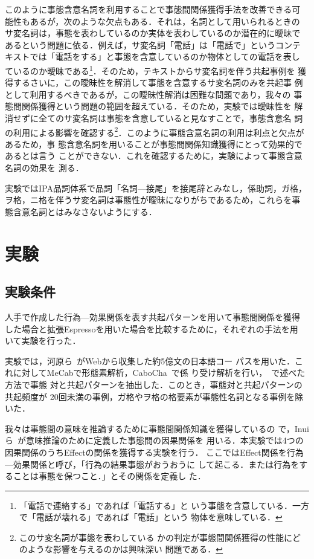 \documentclass[japanese]{jnlp_1.4}
\begin{document}
このように事態含意名詞を利用することで事態間関係獲得手法を改善できる可
能性もあるが，次のような欠点もある．それは，名詞として用いられるときの
サ変名詞は，事態を表わしているのか実体を表わしているのか潜在的に曖昧で
あるという問題に依る．例えば，サ変名詞「電話」は「電話で」というコンテ
キストでは「電話をする」と事態を含意しているのか物体としての電話を表し
ているのか曖昧である\footnote{「電話で連絡する」であれば「電話する」と
  いう事態を含意している．一方で「電話が壊れる」であれば「電話」という
  物体を意味している．}．そのため，テキストからサ変名詞を伴う共起事例を
獲得するさいに，この曖昧性を解消して事態を含意するサ変名詞のみを共起事
例として利用するべきであるが，この曖昧性解消は困難な問題であり，我々の
事態間関係獲得という問題の範囲を超えている．そのため，実験では曖昧性を
解消せずに全てのサ変名詞は事態を含意していると見なすことで，事態含意名
詞の利用による影響を確認する\footnote{このサ変名詞が事態を表わしている
  かの判定が事態間関係獲得の性能にどのような影響を与えるのかは興味深い
  問題である．}．このように事態含意名詞の利用は利点と欠点があるため，事
態含意名詞を用いることが事態間関係知識獲得にとって効果的であるとは言う
ことができない．これを確認するために，実験によって事態含意名詞の効果を
測る．

実験ではIPA品詞体系で品詞「名詞—接尾」を接尾辞とみなし，係助詞，ガ格，
ヲ格，ニ格を伴うサ変名詞は事態性が曖昧になりがちであるため，これらを事
態含意名詞とはみなさないようにする．



\section{実験}

\subsection{実験条件}
\label{sec:experiment}

人手で作成した行為—効果関係を表す共起パターンを用いて事態間関係を獲得
した場合と拡張Espressoを用いた場合を比較するために，それぞれの手法を用
いて実験を行った．

実験では，河原ら~\cite{kawahara2006}がWebから収集した約5億文の日本語コー
パスを用いた．これに対してMeCabで形態素解析，CaboCha~\cite{cabocha}で係
り受け解析を行い，~で述べた方法で事態
対と共起パターンを抽出した．このとき，事態対と共起パターンの共起頻度が
20回未満の事例，ガ格やヲ格の格要素が事態性名詞となる事例を除いた．

我々は事態間の意味を推論するために事態間関係知識を獲得しているの
で，Inuiら~\cite{inui:DS03}が意味推論のために定義した事態間の因果関係を
用いる．本実験では4つの因果関係のうちEffectの関係を獲得する実験を行う．
ここではEffect関係を行為—効果関係と呼び，「行為の結果事態がおうおうに
して起こる．または行為をすることは事態を保つこと．」とその関係を定義し
た．
\end{document}
